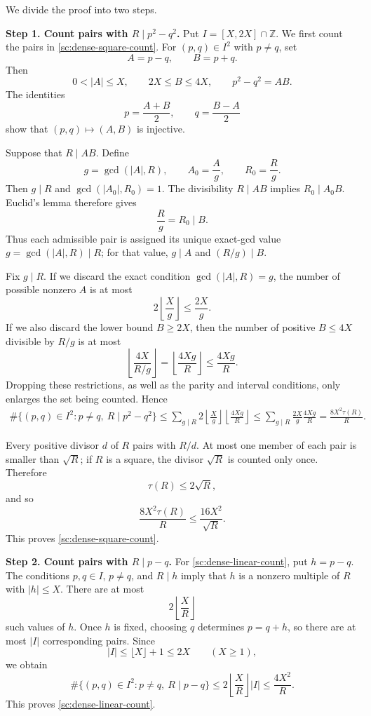 \documentclass[twoside]{aomart}
\makeatletter
\theoremstyle{paperplain}
\theoremstyle{paperdefinition}
\renewenvironment{proof}[1][\proofname]{\par\pushQED{\qed}%
  \normalfont\topsep6\p@\@plus3\p@\relax\trivlist
  \item[\hskip\labelsep\itshape #1\@addpunct{.}]\ignorespaces
}{\popQED\endtrivlist\@endpefalse}
\numberwithin{equation}{section}
\makeatother
\begin{document}
\begin{proof}
We divide the proof into two steps.

\medskip
\noindent\textbf{Step 1. Count pairs with $R\mid p^2-q^2$.}
Put $I=[X,2X]\cap\mathbb Z$. We first count the pairs in
\eqref{sc:dense-square-count}. For $(p,q)\in I^2$ with $p\ne q$,
set
\[
 A=p-q,\qquad B=p+q.
\]
Then
\[
 0<|A|\le X,\qquad 2X\le B\le4X,
 \qquad p^2-q^2=AB.
\]
The identities
\[
 p=\frac{A+B}{2},\qquad q=\frac{B-A}{2}
\]
show that $(p,q)\mapsto(A,B)$ is injective.

Suppose that $R\mid AB$. Define
\[
 g=\gcd(|A|,R),\qquad A_0=\frac Ag,\qquad R_0=\frac Rg.
\]
Then $g\mid R$ and $\gcd(|A_0|,R_0)=1$. The divisibility
$R\mid AB$ implies $R_0\mid A_0B$. Euclid's lemma therefore gives
\[
 \frac Rg=R_0\mid B.
\]
Thus each admissible pair is assigned its unique exact-gcd value
$g=\gcd(|A|,R)\mid R$; for that value, $g\mid A$ and
$(R/g)\mid B$.

Fix $g\mid R$. If we discard the exact condition
$\gcd(|A|,R)=g$, the number of possible nonzero $A$ is at most
\[
 2\left\lfloor\frac Xg\right\rfloor\le\frac{2X}{g}.
\]
If we also discard the lower bound $B\ge2X$, then the number of
positive $B\le4X$ divisible by $R/g$ is at most
\[
 \left\lfloor\frac{4X}{R/g}\right\rfloor
 =\left\lfloor\frac{4Xg}{R}\right\rfloor
 \le\frac{4Xg}{R}.
\]
Dropping these restrictions, as well as the parity and interval
conditions, only enlarges the set being counted. Hence
\begin{align*}
 \#\{(p,q)\in I^2:p\ne q,\ R\mid p^2-q^2\}
 \le\sum_{g\mid R}
 2\left\lfloor\frac Xg\right\rfloor
 \left\lfloor\frac{4Xg}{R}\right\rfloor
 \le\sum_{g\mid R}\frac{2X}{g}\frac{4Xg}{R}
 =\frac{8X^2\tau(R)}{R}.
\end{align*}

Every positive divisor $d$ of $R$ pairs with $R/d$. At most one member
of each pair is smaller than $\sqrt R$; if $R$ is a square, the divisor
$\sqrt R$ is counted only once. Therefore
\[
 \tau(R)\le2\sqrt R,
\]
and so
\[
 \frac{8X^2\tau(R)}{R}\le\frac{16X^2}{\sqrt R}.
\]
This proves \eqref{sc:dense-square-count}.

\medskip
\noindent\textbf{Step 2. Count pairs with $R\mid p-q$.}
For \eqref{sc:dense-linear-count}, put $h=p-q$. The conditions
$p,q\in I$, $p\ne q$, and $R\mid h$ imply that $h$ is a nonzero
multiple of $R$ with $|h|\le X$. There are at most
\[
 2\left\lfloor\frac XR\right\rfloor
\]
such values of $h$. Once $h$ is fixed, choosing $q$ determines
$p=q+h$, so there are at most $|I|$ corresponding pairs. Since
\[
 |I|\le\lfloor X\rfloor+1\le2X\qquad(X\ge1),
\]
we obtain
\[
 \#\{(p,q)\in I^2:p\ne q,\ R\mid p-q\}
 \le2\left\lfloor\frac XR\right\rfloor |I|
 \le\frac{4X^2}{R}.
\]
This proves \eqref{sc:dense-linear-count}.
\end{proof}
\end{document}
